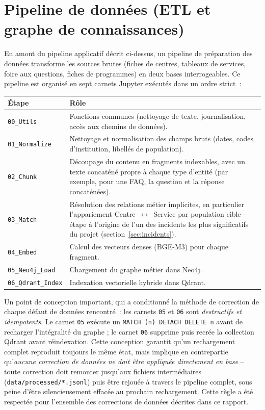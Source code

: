 \section{Pipeline de données (ETL et graphe de connaissances)}

En amont du pipeline applicatif décrit ci-dessus, un pipeline de préparation des données transforme les sources brutes (fiches de centres, tableaux de services, foire aux questions, fiches de programmes) en deux bases interrogeables. Ce pipeline est organisé en sept carnets Jupyter exécutés dans un ordre strict~:

\begin{center}
\begin{tabular}{@{}lp{9.5cm}@{}}
\toprule
\textbf{Étape} & \textbf{Rôle} \\
\midrule
\texttt{00\_Utils} & Fonctions communes (nettoyage de texte, journalisation, accès aux chemins de données). \\
\texttt{01\_Normalize} & Nettoyage et normalisation des champs bruts (dates, codes d'institution, libellés de population). \\
\texttt{02\_Chunk} & Découpage du contenu en fragments indexables, avec un texte concaténé propre à chaque type d'entité (par exemple, pour une FAQ, la question et la réponse concaténées). \\
\texttt{03\_Match} & Résolution des relations métier implicites, en particulier l'appariement Centre~$\leftrightarrow$~Service par population cible -- étape à l'origine de l'un des incidents les plus significatifs du projet (section~\ref{sec:incidents}). \\
\texttt{04\_Embed} & Calcul des vecteurs denses (BGE-M3) pour chaque fragment. \\
\texttt{05\_Neo4j\_Load} & Chargement du graphe métier dans Neo4j. \\
\texttt{06\_Qdrant\_Index} & Indexation vectorielle hybride dans Qdrant. \\
\bottomrule
\end{tabular}
\end{center}

Un point de conception important, qui a conditionné la méthode de correction de chaque défaut de données rencontré~: les carnets \texttt{05} et \texttt{06} sont \emph{destructifs et idempotents}. Le carnet \texttt{05} exécute un \texttt{MATCH (n) DETACH DELETE n} avant de recharger l'intégralité du graphe ; le carnet \texttt{06} supprime puis recrée la collection Qdrant avant réindexation. Cette conception garantit qu'un rechargement complet reproduit toujours le même état, mais implique en contrepartie qu'\emph{aucune correction de données ne doit être appliquée directement en base} -- toute correction doit remonter jusqu'aux fichiers intermédiaires (\texttt{data/processed/*.jsonl}) puis être rejouée à travers le pipeline complet, sous peine d'être silencieusement effacée au prochain rechargement. Cette règle a été respectée pour l'ensemble des corrections de données décrites dans ce rapport.

